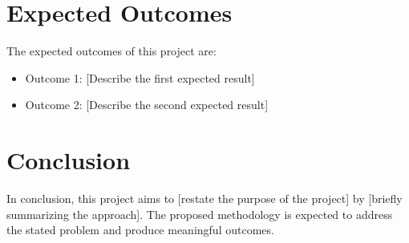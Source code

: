 \documentclass[a4paper, 12pt]{article}
\begin{document}
\section*{Expected Outcomes}
The expected outcomes of this project are:
\begin{itemize}
    \item Outcome 1: [Describe the first expected result]
    \item Outcome 2: [Describe the second expected result]
\end{itemize}

\section*{Conclusion}
In conclusion, this project aims to [restate the purpose of the project] by [briefly summarizing the approach]. The proposed methodology is expected to address the stated problem and produce meaningful outcomes.
\end{document}
